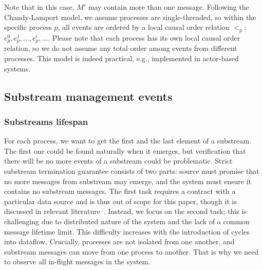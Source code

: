 Note that in this case, $M'$ may contain more than one message. Following the Chandy-Lamport model, we assume processes are single-threaded, so within the specific process $p$, all events are ordered by a local causal order relation $<_p$: $e^{0}_p,e^{1}_p,\ldots,e^{i}_p,\ldots$. Please note that each process has its own local causal order relation, so we do not assume any total order among events from different processes. This model is indeed practical, e.g., implemented in actor-based systems.


\subsection{Substream management events}

\subsubsection{Substreams lifespan}

For each process, we want to get the first and the last element of a substream. The first one could be found naturally when it emerges, but verification that there will be no more events of a substream could be problematic. Strict substream termination guarantee consists of two parts: source must promise that no more messages from substream may emerge, and the system must ensure it contains no substream messages. The first task requires a contract with a particular data source and is thus out of scope for this paper, though it is discussed in relevant literature~\cite{awad2019adaptive}. Instead, we focus on the second task; this is challenging due to distributed nature of the system and the lack of a common message lifetime limit. This difficulty increases with the introduction of cycles into dataflow. Crucially, processes are not isolated from one another, and substream messages can move from one process to another. That is why we need to observe all in-flight messages in the system.

